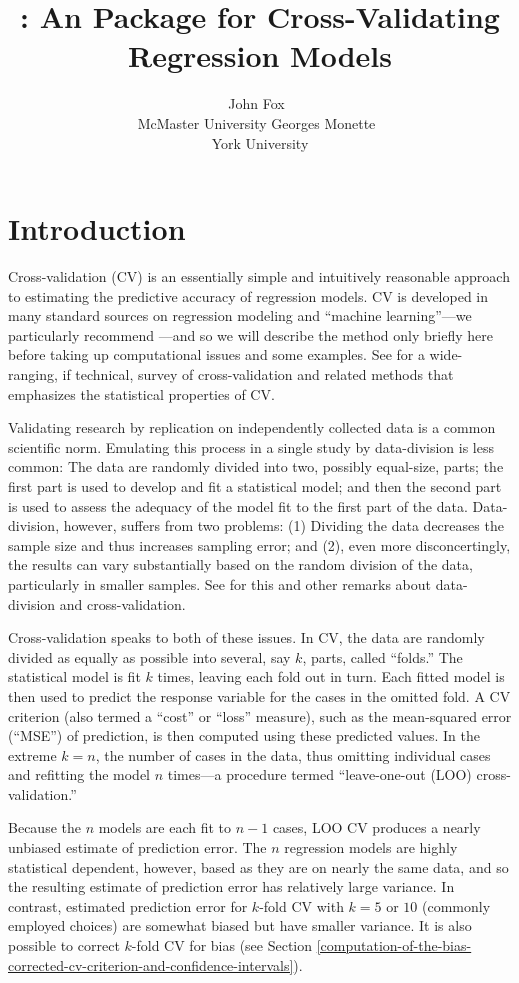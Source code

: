 \documentclass[
]{jss}
\author{
John Fox~\orcidlink{0000-0002-1196-8012}\\McMaster
University \And Georges Monette~\orcidlink{0000-0003-0076-5532}\\York
University
}
\title{\pkg{cv}: An \proglang{R} Package for Cross-Validating Regression
Models}
\begin{document}
\section{Introduction}\label{introduction}

Cross-validation (CV) is an essentially simple and intuitively
reasonable approach to estimating the predictive accuracy of regression
models. CV is developed in many standard sources on regression modeling
and ``machine learning''---we particularly recommend \citet[Secs. 5.1,
5.3]{JamesEtAl:2021}---and so we will describe the method only briefly
here before taking up computational issues and some examples. See
\citet{ArlotCelisse:2010} for a wide-ranging, if technical, survey of
cross-validation and related methods that emphasizes the statistical
properties of CV.

Validating research by replication on independently collected data is a
common scientific norm. Emulating this process in a single study by
data-division is less common: The data are randomly divided into two,
possibly equal-size, parts; the first part is used to develop and fit a
statistical model; and then the second part is used to assess the
adequacy of the model fit to the first part of the data. Data-division,
however, suffers from two problems: (1) Dividing the data decreases the
sample size and thus increases sampling error; and (2), even more
disconcertingly, the results can vary substantially based on the random
division of the data, particularly in smaller samples. See \citet[Sec.
5.3]{Harrell:2015} for this and other remarks about data-division and
cross-validation.

Cross-validation speaks to both of these issues. In CV, the data are
randomly divided as equally as possible into several, say \(k\), parts,
called ``folds.'' The statistical model is fit \(k\) times, leaving each
fold out in turn. Each fitted model is then used to predict the response
variable for the cases in the omitted fold. A CV criterion (also termed
a ``cost'' or ``loss'' measure), such as the mean-squared error
(``MSE'') of prediction, is then computed using these predicted values.
In the extreme \(k = n\), the number of cases in the data, thus omitting
individual cases and refitting the model \(n\) times---a procedure
termed ``leave-one-out (LOO) cross-validation.''

Because the \(n\) models are each fit to \(n - 1\) cases, LOO CV
produces a nearly unbiased estimate of prediction error. The \(n\)
regression models are highly statistical dependent, however, based as
they are on nearly the same data, and so the resulting estimate of
prediction error has relatively large variance. In contrast, estimated
prediction error for \(k\)-fold CV with \(k = 5\) or \(10\) (commonly
employed choices) are somewhat biased but have smaller variance. It is
also possible to correct \(k\)-fold CV for bias (see Section
\ref{computation-of-the-bias-corrected-cv-criterion-and-confidence-intervals}).
\end{document}
